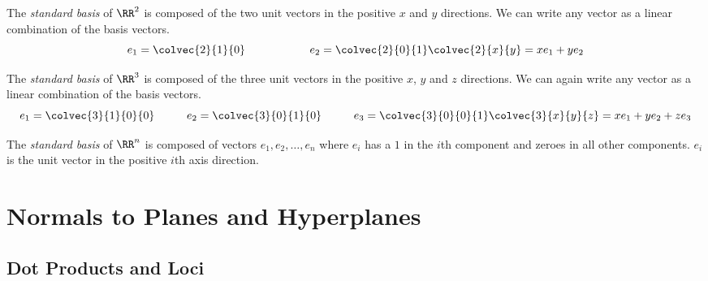 \documentclass[fleqn]{report}
\begin{document}
\begin{defn}
The \emph{standard basis} of $\RR^2$ is composed of the two
unit vectors in the positive $x$ and $y$ directions. We can
write any vector as a linear combination of the basis
vectors.
\begin{displaymath}
e_1 = \colvec{2}{1}{0} \hspace{2cm} e_2 = \colvec{2}{0}{1} \\
\colvec{2}{x}{y} = x e_1 + y e_2
\end{displaymath}

The \emph{standard basis} of $\RR^3$ is composed of the three
unit vectors in the positive $x$, $y$ and $z$ directions. We
can again write any vector as a linear combination of the
basis vectors.
\begin{displaymath}
e_1 = \colvec{3}{1}{0}{0} \hspace{1cm}
e_2 = \colvec{3}{0}{1}{0} \hspace{1cm}
e_3 = \colvec{3}{0}{0}{1} \\
\colvec{3}{x}{y}{z} = x e_1 + y e_2 + z e_3
\end{displaymath}

The \emph{standard basis} of $\RR^n$ is composed of vectors
$e_1, e_2, \ldots, e_n$ where $e_i$ has a $1$ in the $i$th
component and zeroes in all other components. $e_i$
is the unit vector in the positive $i$th axis direction.
\end{defn}

\section{Normals to Planes and Hyperplanes}
\label{normals}

\subsection{Dot Products and Loci} 
\label{dot-product-and-loci}
\end{document}
